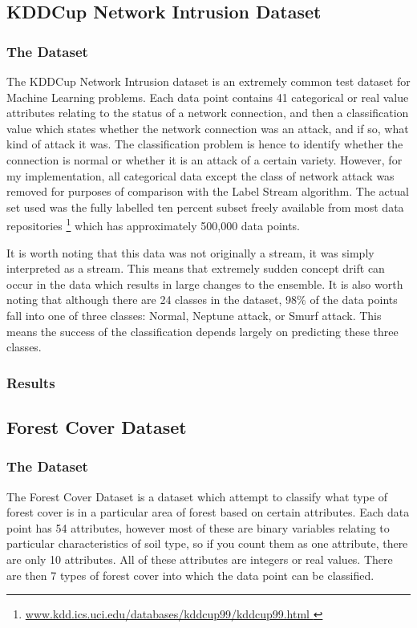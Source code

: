 \documentclass[12pt,a4paper,oneside]{report}
\begin{document}
\subsection{KDDCup Network Intrusion Dataset}
\subsubsection{The Dataset}

The KDDCup Network Intrusion dataset is an extremely common test dataset for Machine Learning problems. Each data point contains 41 categorical or real value attributes relating to the status of a network connection, and then a classification value which states whether the network connection was an attack, and if so, what kind of attack it was. The classification problem is hence to identify whether the connection is normal or whether it is an attack of a certain variety. However, for my implementation, all categorical data except the class of network attack was removed for purposes of comparison with the Label Stream algorithm. The actual set used was the fully labelled ten percent subset freely available from most data repositories \footnote{\url{ www.kdd.ics.uci.edu/databases/kddcup99/kddcup99.html } } which has approximately 500,000 data points.    

It is worth noting that this data was not originally a stream, it was simply interpreted as a stream. This means that extremely sudden concept drift can occur in the data which results in large changes to the ensemble. It is also worth noting that although there are 24 classes in the dataset, 98\(\%\) of the data points fall into one of three classes: Normal, Neptune attack, or Smurf attack. This means the success of the classification depends largely on predicting these three classes. 
\subsubsection{Results}

\subsection{Forest Cover Dataset}
\subsubsection{The Dataset}

The Forest Cover Dataset is a dataset which attempt to classify what type of forest cover is in a particular area of forest based on certain attributes. Each data point has 54 attributes, however most of these are binary variables relating to particular characteristics of soil type, so if you count them as one attribute, there are only 10 attributes. All of these attributes are integers or real values.  There are then 7 types of forest cover into which the data point can be classified. 
\end{document}
